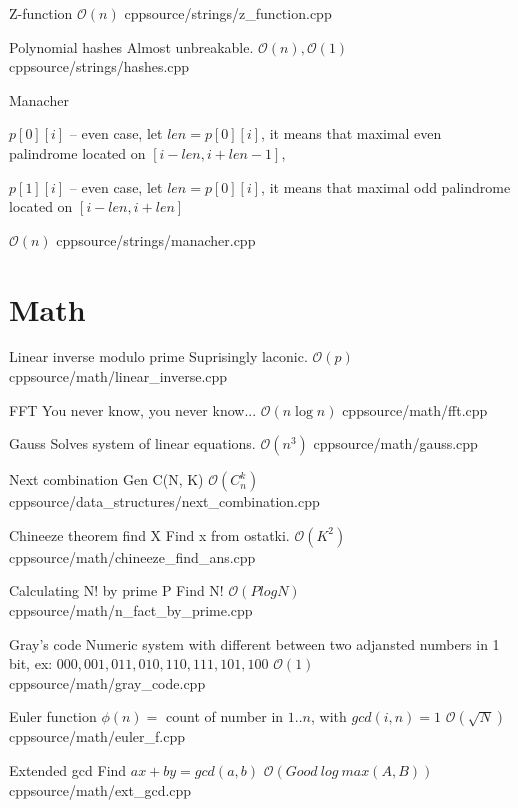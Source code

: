\documentclass[landscape, 10pt, a4paper, oneside, twocolumn]{extarticle}
\begin{document}
\Algorithm
{Z-function}
{}
{$\mathcal{O}(n)$}
{cpp}{source/strings/z_function.cpp}

\Algorithm
{Polynomial hashes}
{Almost unbreakable.}
{$\mathcal{O}(n), \mathcal{O}(1)$}
{cpp}{source/strings/hashes.cpp}

\Algorithm
{Manacher}
{$p[0][i]$ – even case, let $len = p[0][i]$,
it means that maximal even palindrome located on $[i - len, i + len - 1]$,

$p[1][i]$ – even case, let $len = p[0][i]$,
it means that maximal odd palindrome located on $[i - len, i + len]$
}
{$\mathcal{O}(n)$}
{cpp}{source/strings/manacher.cpp}





\section{Math}

\Algorithm
{Linear inverse modulo prime}
{Suprisingly laconic.}
{$\mathcal{O}(p)$}
{cpp}{source/math/linear_inverse.cpp}

\Algorithm
{FFT}
{You never know, you never know...}
{$\mathcal{O}(n \log n)$}
{cpp}{source/math/fft.cpp}

\Algorithm
{Gauss}
{Solves system of linear equations.}
{$\mathcal{O}(n^{3})$}
{cpp}{source/math/gauss.cpp}

\Algorithm
{Next combination}
{Gen C(N, K)}
{$\mathcal{O}(C_{n}^{k})$}
{cpp}{source/data_structures/next_combination.cpp}

\Algorithm
{Chineeze theorem find X}
{Find x from ostatki.}
{$\mathcal{O}(K^{2})$}
{cpp}{source/math/chineeze_find_ans.cpp}

\Algorithm
{Calculating N! by prime P}
{Find N!}
{$\mathcal{O}(P log N)$}
{cpp}{source/math/n_fact_by_prime.cpp}

\Algorithm
{Gray's code}
{Numeric system with different between two adjansted numbers in 1 bit, ex: $000, 001, 011, 010, 110, 111, 101, 100$}
{$\mathcal{O}(1)$}
{cpp}{source/math/gray_code.cpp}

\Algorithm
{Euler function}
{$\phi(n) = $ count of number in $1..n$, with $gcd(i, n) = 1$}
{$\mathcal{O}(\sqrt{N})$}
{cpp}{source/math/euler_f.cpp}

\Algorithm
{Extended gcd}
{Find $a x + b y = gcd(a, b)$}
{$\mathcal{O}(Good\ log\ max(A, B))$}
{cpp}{source/math/ext_gcd.cpp}
\end{document}
